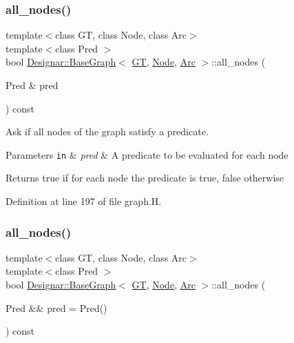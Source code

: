\subsubsection{\texorpdfstring{all\+\_\+nodes()}{all\_nodes()}\hspace{0.1cm}{\footnotesize\ttfamily [1/2]}}
{\footnotesize\ttfamily template$<$class GT, class Node, class Arc$>$ \\
template$<$class Pred $>$ \\
bool \hyperlink{class_designar_1_1_base_graph}{Designar\+::\+Base\+Graph}$<$ \hyperlink{demo-buildgraph_8_c_a3001c40d2c31ca87ed96cd7d1334a55e}{GT}, \hyperlink{namespace_designar_a5af326c65aa2bd26b26c410f2030d09e}{Node}, \hyperlink{namespace_designar_a3f55fb5513d62ff47cbc8f72b8e95d6f}{Arc} $>$\+::all\+\_\+nodes (\begin{DoxyParamCaption}\item[{Pred \&}]{pred }\end{DoxyParamCaption}) const\hspace{0.3cm}{\ttfamily [inline]}}



Ask if all nodes of the graph satisfy a predicate. 


\begin{DoxyParams}[1]{Parameters}
\mbox{\tt in}  & {\em pred} & A predicate to be evaluated for each node \\
\hline
\end{DoxyParams}
\begin{DoxyReturn}{Returns}
{\ttfamily true} if for each node the predicate is true, {\ttfamily false} otherwise 
\end{DoxyReturn}


Definition at line 197 of file graph.\+H.

\mbox{\label{class_designar_1_1_base_graph_a32419ec17712a60c1964bc91e78d135c}} 
\subsubsection{\texorpdfstring{all\+\_\+nodes()}{all\_nodes()}\hspace{0.1cm}{\footnotesize\ttfamily [2/2]}}
{\footnotesize\ttfamily template$<$class GT, class Node, class Arc$>$ \\
template$<$class Pred $>$ \\
bool \hyperlink{class_designar_1_1_base_graph}{Designar\+::\+Base\+Graph}$<$ \hyperlink{demo-buildgraph_8_c_a3001c40d2c31ca87ed96cd7d1334a55e}{GT}, \hyperlink{namespace_designar_a5af326c65aa2bd26b26c410f2030d09e}{Node}, \hyperlink{namespace_designar_a3f55fb5513d62ff47cbc8f72b8e95d6f}{Arc} $>$\+::all\+\_\+nodes (\begin{DoxyParamCaption}\item[{Pred \&\&}]{pred = {\ttfamily Pred()} }\end{DoxyParamCaption}) const\hspace{0.3cm}{\ttfamily [inline]}}



